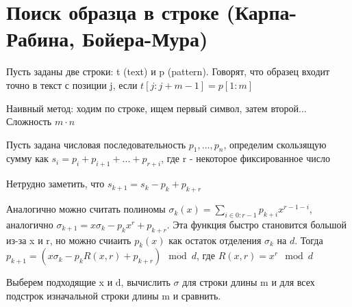 \documentclass[discrete.tex]{subfiles}
\begin{document}
  \section{Поиск образца в строке (Карпа-Рабина, Бойера-Мура)}

  \begin{definition}
    Пусть заданы две строки: t (text) и p (pattern). Говорят, что образец входит точно в текст с позиции j, если $t[j:j+m-1] = p[1:m]$
  \end{definition}

  Наивный метод: ходим по строке, ищем первый символ, затем второй... Сложность $m \cdot n$

  \begin{definition}
    Пусть задана числовая последовательность $p_1,...,p_n$, определим скользящую сумму как $s_i=p_i+p_{i+1}+...+p_{r+i}$, где r - некоторое фиксированное число
  \end{definition}

  \begin{remark}
    Нетрудно заметить, что $s_{k+1} = s_k - p_k + p_{k+r}$
  \end{remark}

  \begin{remark}
    Аналогично можно считать полиномы $\sigma_k(x) = \sum_{i \in 0 : r-1} p_{k+i} x^{r-1-i}$, аналогично $\sigma_{k+1} = x \sigma_k - p_k x^r + p_{k+r}$. Эта функция быстро становится большой из-за x и r, но можно счиаить $p_k(x)$ как остаток отделения $\sigma_k$ на $d$. Тогда $p_{k+1} = (x \sigma_k - p_k R(x,r) + p_{k+r}) \mod d$, где $R(x,r) = x^r \mod d$
  \end{remark}

  \begin{alg}
    Выберем подходящие x и d, вычислить $\sigma$ для строки длины m и для всех подстрок изначальной строки длины m и сравнить.
  \end{alg}
\end{document}
